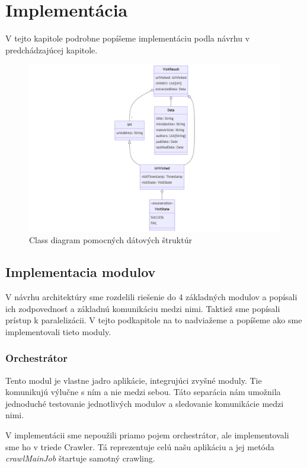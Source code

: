 \chapter{Implementácia}
\label{implementation}

V tejto kapitole podrobne popíšeme implementáciu podla návrhu v predchádzajúcej kapitole. 

\begin{figure}[!ht]
    \centering
    \includegraphics[width=.9\textwidth]{figures/classDiagramVisitResult.png}
    \caption{Class diagram pomocných dátových štruktúr \label{o:classDiagramVisitResult}}
\end{figure}

\section{Implementacia modulov}
V návrhu architektúry sme rozdelili riešenie do 4 základných modulov a popísali ich zodpovednosť a základnú komunikáciu medzi nimi. Taktiež sme popísali prístup k paralelizácii. V tejto podkapitole na to nadviažeme a popíšeme ako sme implementovali tieto moduly. 

\subsection{Orchestrátor}
Tento modul je vlastne jadro aplikácie, integrujúci zvyšné moduly. Tie komunikujú výlučne s ním a nie medzi sebou. Táto separácia nám umožnila jednoduché testovanie jednotlivých modulov a sledovanie komunikácie medzi nimi.

V implementácii sme nepoužili priamo pojem orchestrátor, ale implementovali sme ho v triede Crawler. Tá reprezentuje celú našu aplikáciu a jej metóda \textit{crawlMainJob}  štartuje samotný crawling. 

